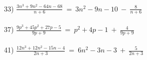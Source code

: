 \documentclass[11pt]{book}
\theoremstyle{definition}  %
\begin{document}
~\\
  33) $\frac{3 n^3 + 9 n^2 - 64 n - 68}{n + 6}~=~3n^2-9n-10~-~\frac{8}{n + 6}$\\
~\\
  37) $\frac{9 p^3 + 45 p^2 + 27 p - 5}{9 p + 9}~=~p^2+4p-1~+~\frac{4}{9 p + 9}$\\
~\\
  41) $\frac{12 n^3 + 12 n^2 - 15 n - 4}{2 n + 3}~=~6n^2-3n-3~+~\frac{5}{2 n + 3}$
\end{document}
